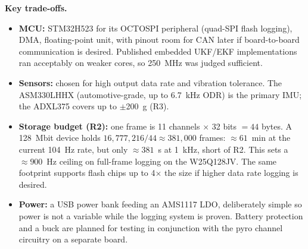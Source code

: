 \documentclass[10pt,letterpaper]{article}
\begin{document}
\vspace{4pt}
\textbf{Key trade-offs.}
\begin{itemize}
\item \textbf{MCU:} STM32H523 for its OCTOSPI peripheral (quad-SPI flash logging), DMA,
  floating-point unit, with pinout room for CAN later if board-to-board communication is desired. Published
  embedded UKF/EKF implementations ran acceptably on weaker cores, so 250~MHz was judged sufficient.
\item \textbf{Sensors:} chosen for high output data rate and vibration tolerance. The ASM330LHHX
  (automotive-grade, up to 6.7~kHz ODR) is the primary IMU; the ADXL375 covers up to $\pm$200~g (R3).
\item \textbf{Storage budget (R2):} one frame is 11 channels $\times$ 32 bits $= 44$ bytes. A 128~Mbit
  device holds $16{,}777{,}216 / 44 \approx 381{,}000$ frames: $\approx 61$~min at the current
  104~Hz rate, but only $\approx 381$~s at 1~kHz, short of R2. This sets a $\approx 900$~Hz ceiling on
  full-frame logging on the W25Q128JV. The same footprint supports flash chips up to 4$\times$ the size if higher data rate logging is desired.
\item \textbf{Power:} a USB power bank feeding an AMS1117 LDO, deliberately simple so power is not
  a variable while the logging system is proven. Battery protection and a buck are planned for testing in conjunction with the pyro channel circuitry on a separate board.
\end{itemize}

\end{document}
